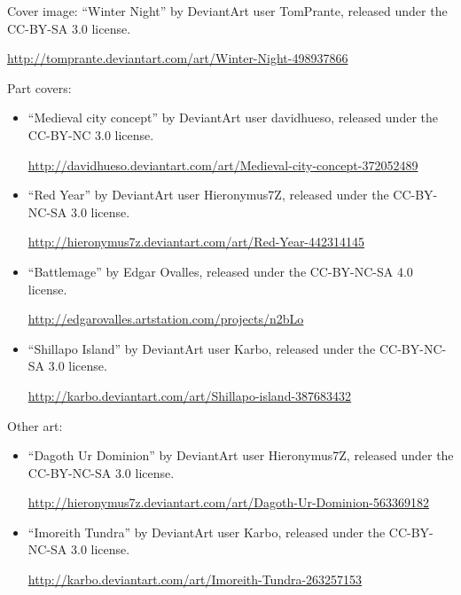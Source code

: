 \item Cover image: ``Winter Night'' by DeviantArt user TomPrante,
  released under the CC-BY-SA 3.0 license.

  \url{http://tomprante.deviantart.com/art/Winter-Night-498937866}

\item Part covers: \begin{itemize}

\item ``Medieval city concept'' by DeviantArt user davidhueso, released under the CC-BY-NC 3.0 license.

  \url{http://davidhueso.deviantart.com/art/Medieval-city-concept-372052489}

\item ``Red Year'' by DeviantArt user Hieronymus7Z, released under the CC-BY-NC-SA 3.0 license.

  \url{http://hieronymus7z.deviantart.com/art/Red-Year-442314145}

\item ``Battlemage'' by Edgar Ovalles, released under the CC-BY-NC-SA 4.0 license.

  \url{http://edgarovalles.artstation.com/projects/n2bLo}

\item ``Shillapo Island'' by DeviantArt user Karbo, released under the CC-BY-NC-SA 3.0 license.

  \url{http://karbo.deviantart.com/art/Shillapo-island-387683432}

\end{itemize}

\item Other art: \begin{itemize}

\item ``Dagoth Ur Dominion'' by DeviantArt user Hieronymus7Z, released under the CC-BY-NC-SA 3.0 license.

  \url{http://hieronymus7z.deviantart.com/art/Dagoth-Ur-Dominion-563369182}

\item ``Imoreith Tundra'' by DeviantArt user Karbo, released under the CC-BY-NC-SA 3.0 license.

  \url{http://karbo.deviantart.com/art/Imoreith-Tundra-263257153}

\end{itemize}
